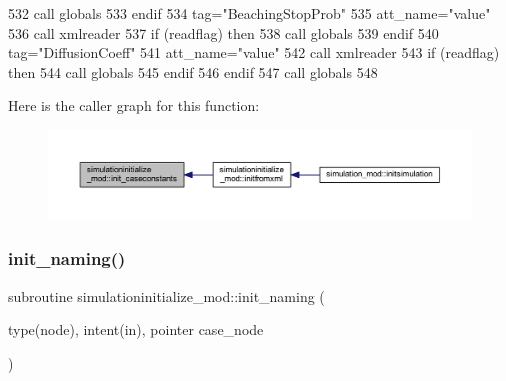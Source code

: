 \begin{DoxyCode}
532             \textcolor{keyword}{call }globals%
533 \textcolor{keywordflow}{        endif}
534         tag=\textcolor{stringliteral}{"BeachingStopProb"}
535         att\_name=\textcolor{stringliteral}{"value"}
536         \textcolor{keyword}{call }xmlreader%
537         \textcolor{keywordflow}{if} (readflag) \textcolor{keywordflow}{then}
538             \textcolor{keyword}{call }globals%
539 \textcolor{keywordflow}{        endif}
540         tag=\textcolor{stringliteral}{"DiffusionCoeff"}
541         att\_name=\textcolor{stringliteral}{"value"}
542         \textcolor{keyword}{call }xmlreader%
543         \textcolor{keywordflow}{if} (readflag) \textcolor{keywordflow}{then}
544             \textcolor{keyword}{call }globals%
545 \textcolor{keywordflow}{        endif}
546 \textcolor{keywordflow}{    endif}
547     \textcolor{keyword}{call }globals%
548 
\end{DoxyCode}
Here is the caller graph for this function\+:\nopagebreak
\begin{figure}[H]
\begin{center}
\leavevmode
\includegraphics[width=350pt]{namespacesimulationinitialize__mod_ae41256ca5e72ebf27660ffdfe5c08e46_icgraph}
\end{center}
\end{figure}
\mbox{\label{namespacesimulationinitialize__mod_a4909cc4cb57549e6eed3f69d6dfa30b5}} 
\subsubsection{\texorpdfstring{init\+\_\+naming()}{init\_naming()}}
{\footnotesize\ttfamily subroutine simulationinitialize\+\_\+mod\+::init\+\_\+naming (\begin{DoxyParamCaption}\item[{type(node), intent(in), pointer}]{case\+\_\+node }\end{DoxyParamCaption})\hspace{0.3cm}{\ttfamily [private]}}



